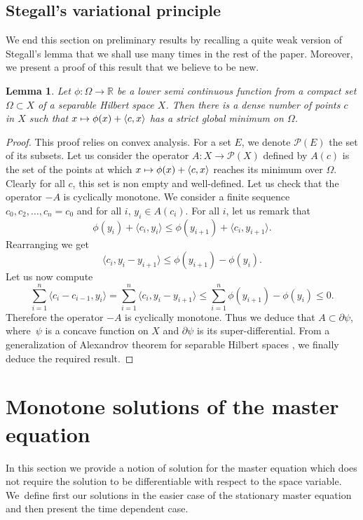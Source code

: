 \documentclass[JEP,XML,SOM,Unicode,NoEqCountersInSection,published]{cedram}
\let\mathcal\mathscr
\newcommand\mto{\mathchoice{\longmapsto}{\mapsto}{\mapsto}{\mapsto}}
\newtheorem{Lemma}{Lemma}[section]
\theoremstyle{definition}
\begin{document}
\subsection{Stegall's variational principle}
We end this section on preliminary results by recalling a quite weak version of Stegall's lemma \cite{stegall1978optimization,stegall1986optimization,fabian2007stegall} that we shall use many times in the rest of the paper. Moreover, we present a proof of this result that we believe to be new.
\begin{Lemma}\label{stegall}
Let $\phi: \Omega \to \mathbb{R}$ be a lower semi continuous function from a compact set $\Omega \subset X$ of a separable Hilbert space $X$. Then there is a dense number of points $c$ in $X$ such that $x \mto \phi(x)+\langle c,x\rangle$ has a strict global minimum on $\Omega$.
\end{Lemma}
\begin{proof}
This proof relies on convex analysis. For a set $E$, we denote $\mathcal{P}(E)$ the set of its subsets. Let us consider the operator $A: X \to \mathcal{P}(X)$ defined by $A(c)$ is the set of the points at which $x \mto \phi(x)+\langle c,x\rangle$ reaches its minimum over $\Omega$. Clearly for all $c$, this set is non empty and well-defined. Let us check that the operator $-A$ is cyclically monotone. We consider a finite sequence $c_0,c_2,\dots,c_n = c_0$ and for all $i$, $y_i \in A(c_i)$. For all $i$, let us remark that
\begin{equation*}
\phi(y_i)+\langle c_i, y_i\rangle \leq \phi(y_{i+1})+\langle c_i, y_{i+1} \rangle.
\end{equation*}
Rearranging we get
\begin{equation*}
\langle c_i, y_i-y_{i+1}\rangle \leq \phi(y_{i+1})-\phi(y_i).
\end{equation*}
Let us now compute
\begin{equation*}
\sum_{i =1}^n \langle c_i-c_{i-1}, y_i \rangle = \sum_{i =1}^n \langle c_i, y_i-y_{i+1} \rangle \leq \sum_{i = 1}^n \phi(y_{i+1})-\phi(y_i) \leq 0.
\end{equation*}
Therefore the operator $-A$ is cyclically monotone. Thus we deduce that $A \subset \partial \psi$, where~$\psi$ is a concave function on $X$ and $\partial \psi$ is its super-differential. From a generalization of Alexandrov theorem for separable Hilbert spaces \cite{borwein1994second}, we finally deduce the required result.
\end{proof}

\section{Monotone solutions of the master equation}\label{sectionmon}
In this section we provide a notion of solution for the master equation which does not require the solution to be differentiable with respect to the space variable. We~define first our solutions in the easier case of the stationary master equation and then present the time dependent case.
\end{document}
